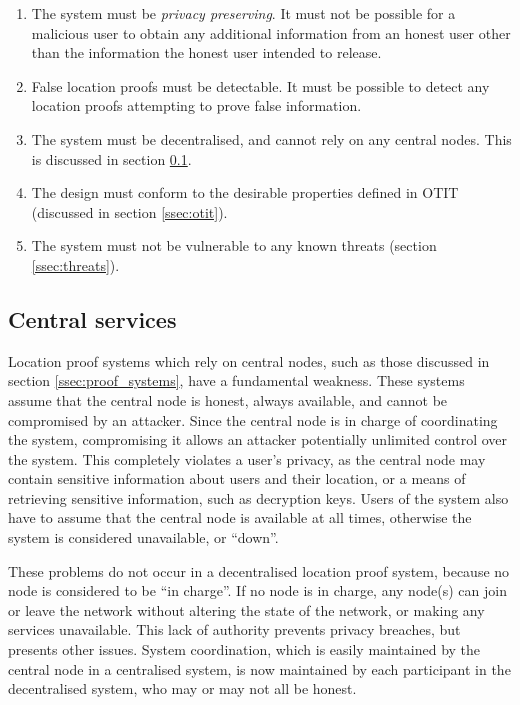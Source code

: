 \begin{enumerate}
	\item The system must be \textit{privacy preserving}. It must not be possible for a malicious user to obtain any additional information from an honest user other than the information the honest user intended to release.
	\item False location proofs must be detectable. It must be possible to detect any location proofs attempting to prove false information.
	\item The system must be decentralised, and cannot rely on any central nodes. This is discussed in section \ref{ssec:centralised}.
	\item The design must conform to the desirable properties defined in OTIT (discussed in section \ref{ssec:otit}).
	\item The system must not be vulnerable to any known threats (section \ref{ssec:threats}).
\end{enumerate}

\subsection{Central services} \label{ssec:centralised}
Location proof systems which rely on central nodes, such as those discussed in section \ref{ssec:proof_systems}, have a fundamental weakness. These systems assume that the central node is honest, always available, and cannot be compromised by an attacker. Since the central node is in charge of coordinating the system, compromising it allows an attacker potentially unlimited control over the system. This completely violates a user's privacy, as the central node may contain sensitive information about users and their location, or a means of retrieving sensitive information, such as decryption keys. Users of the system also have to assume that the central node is available at all times, otherwise the system is considered unavailable, or ``down''.

These problems do not occur in a decentralised location proof system, because no node is considered to be ``in charge''. If no node is in charge, any node(s) can join or leave the network without altering the state of the network, or making any services unavailable. This lack of authority prevents privacy breaches, but presents other issues. System coordination, which is easily maintained by the central node in a centralised system, is now maintained by each participant in the decentralised system, who may or may not all be honest.

